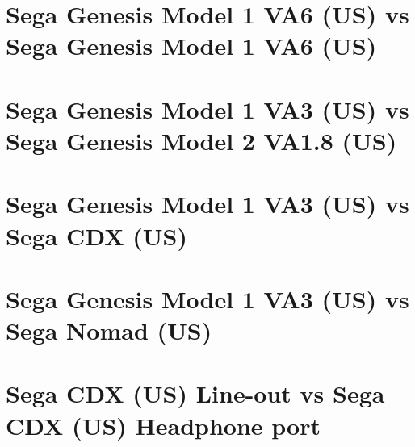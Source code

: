 \documentclass[10pt,a4paper]{report}
\begin{document}
\section{Sega Genesis Model 1 VA6 (US) vs Sega Genesis Model 1 VA6 (US)}

\section{Sega Genesis Model 1 VA3 (US) vs Sega Genesis Model 2 VA1.8 (US)}

\section{Sega Genesis Model 1 VA3 (US) vs Sega CDX (US)}

\section{Sega Genesis Model 1 VA3 (US) vs Sega Nomad (US)}

\section{Sega CDX (US) Line-out vs Sega CDX (US) Headphone port}
\end{document}
